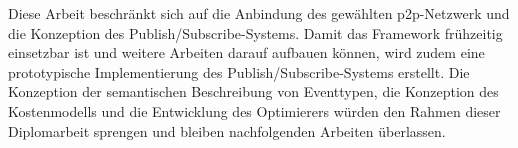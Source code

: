 Diese Arbeit beschränkt sich auf die Anbindung des gewählten \ac{p2p}-Netzwerk und die Konzeption des Publish/Subscribe-Systems. Damit das Framework frühzeitig einsetzbar ist und weitere Arbeiten darauf aufbauen können, wird zudem eine prototypische Implementierung des Publish/Subscribe-Systems erstellt. Die Konzeption der semantischen Beschreibung von Eventtypen, die Konzeption des Kostenmodells und die Entwicklung des Optimierers würden den Rahmen dieser Diplomarbeit sprengen und bleiben nachfolgenden Arbeiten überlassen.
